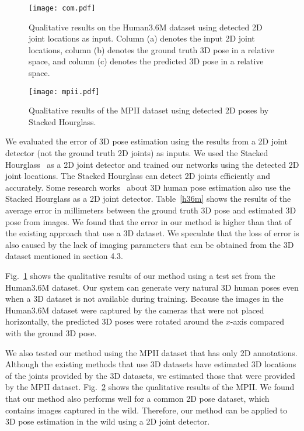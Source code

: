 \documentclass[runningheads]{llncs}
\newcommand{\Tref}[1]{Table~\ref{#1}}
\newcommand{\Fref}[1]{Fig.~\ref{#1}}
\begin{document}
\begin{figure}[tb]
	\begin{center}
		\texttt{[image: com.pdf]}
		\caption{Qualitative results on the Human3.6M dataset using detected 2D joint locations as input. Column (a) denotes the input 2D joint locations, column (b) denotes the ground truth 3D pose in a relative space, and column (c) denotes the predicted 3D pose in a relative space.}
		\label{com}
	\end{center}
\end{figure}

\begin{figure}[tb]
	\begin{center}
		\texttt{[image: mpii.pdf]}
		\caption{Qualitative results of the MPII dataset using detected 2D poses by Stacked Hourglass.}
		\label{mpii-result}
	\end{center}
\end{figure}

We evaluated the error of 3D pose estimation using the results from a 2D joint detector (not the ground truth 2D joints) as inputs.
We used the Stacked Hourglass~\cite{newell2016stacked} as a 2D joint detector and trained our networks using the detected 2D joint locations.
The Stacked Hourglass can detect 2D joints efficiently and accurately.
Some research works~\cite{pavlakos2017coarse,martinez20173dbaseline} about 3D human pose estimation also use the Stacked Hourglass as a 2D joint detector.
\Tref{h36m} shows the results of the average error in millimeters between the ground truth 3D pose and estimated 3D pose from images.
We found that the error in our method is higher than that of the existing approach that use a 3D dataset.
We speculate that the loss of error is also caused by the lack of imaging parameters that can be obtained from the 3D dataset mentioned in section 4.3.

\Fref{com} shows the qualitative results of our method using a test set from the Human3.6M dataset.
Our system can generate very natural 3D human poses even when a 3D dataset is not available during training.
Because the images in the Human3.6M dataset were captured by the cameras that were not placed horizontally, the predicted 3D poses were rotated around the $x$-axis compared with the ground 3D pose.

We also tested our method using the MPII dataset that has only 2D annotations.
Although the existing methods that use 3D datasets have estimated 3D locations of the joints provided by the 3D datasets, we estimated those that were provided by the MPII dataset.
\Fref{mpii-result} shows the qualitative results of the MPII.
We found that our method also performs well for a common 2D pose dataset, which contains images captured in the wild.
Therefore, our method can be applied to 3D pose estimation in the wild using a 2D joint detector.
\end{document}
